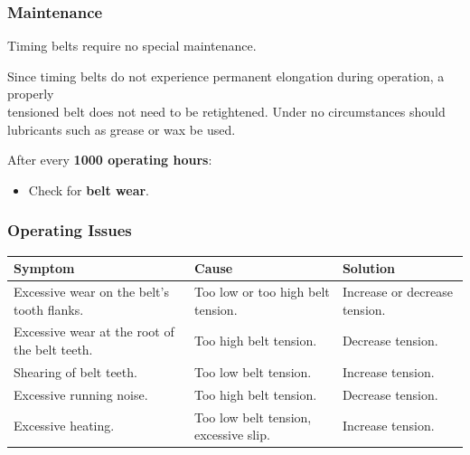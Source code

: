 \newpage

\setcounter{page}{5}

\subsubsection*{Maintenance}

Timing belts require no special maintenance.

Since timing belts do not experience permanent elongation during operation, a properly \\tensioned belt does not need to be retightened.  
Under no circumstances should lubricants such as grease or wax be used.

After every \textbf{1000 operating hours}:
\begin{itemize}
    \item Check for \textbf{belt wear}.
\end{itemize}

\subsubsection*{Operating Issues}

\begin{table}[H]
    \centering
    \renewcommand{\arraystretch}{1.2}
    \begin{tabular}{|p{}|p{}|p{}|}
        \hline
        \textbf{Symptom} & \textbf{Cause} & \textbf{Solution} \\
        \hline
        Excessive wear on the belt's tooth flanks. & Too low or too high belt tension. & Increase or decrease tension. \\
        \hline
        Excessive wear at the root of the belt teeth. & Too high belt tension. & Decrease tension. \\
        \hline
        Shearing of belt teeth. & Too low belt tension. & Increase tension. \\
        \hline
        Excessive running noise. & Too high belt tension. & Decrease tension. \\
        \hline
        Excessive heating. & Too low belt tension, excessive slip. & Increase tension. \\
        \hline
    \end{tabular}
\end{table}


